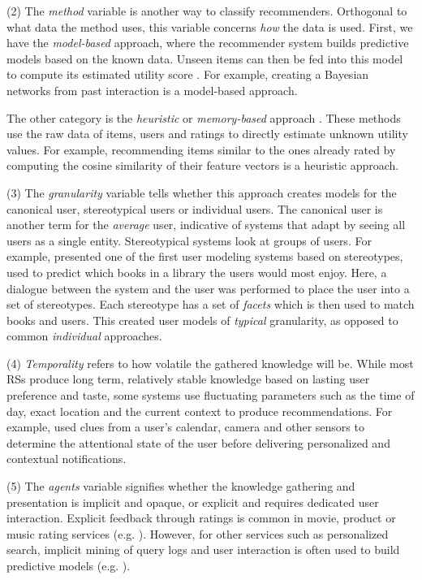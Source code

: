 (2) The \emph{method} variable is another way to classify recommenders. Orthogonal to what data the method uses, this variable
concerns \emph{how} the data is used.
First, we have the \emph{model-based} approach, where the recommender system builds predictive models based on the known data. 
Unseen items can then be fed into this model to compute its estimated utility score
\cite[p.5]{Adomavicius2005}. 
For example, creating a Bayesian networks from past interaction is a model-based approach.

The other category is the \emph{heuristic} or \emph{memory-based} approach \cite[p.5]{Adomavicius2005}. 
These methods use the raw data of items, users and ratings to directly estimate unknown utility values. 
For example, recommending items similar to the ones already rated by computing the cosine similarity of their feature vectors is a heuristic approach.

(3) The \emph{granularity} variable tells whether this approach creates models for the canonical user, stereotypical users or individual users. 
The canonical user is another term for the \emph{average} user, indicative of systems that adapt by seeing all users as a single entity. 
Stereotypical systems look at groups of users. 
For example, \cite{Rich1979} presented one of the first user modeling systems based on stereotypes, 
used to predict which books in a library the users would most enjoy.
Here, a dialogue between the system and the user was performed to place the user into a set of stereotypes. 
Each stereotype has a set of \emph{facets} which is then used to match books and users.
This created user models of \emph{typical} granularity, as opposed to common \emph{individual} approaches.

(4) \emph{Temporality} refers to how volatile the gathered knowledge will be.
While most RSs produce long term, relatively stable knowledge based on lasting user preference and taste, 
some systems use fluctuating parameters such as the time of day, exact location and the current context to produce recommendations.
For example, \cite{Horvitz} used clues from a user's calendar, camera and other sensors to determine the attentional state
of the user before delivering personalized and contextual notifications.

(5) The \emph{agents} variable signifies whether the knowledge gathering and presentation is implicit and opaque, 
or explicit and requires dedicated user interaction. Explicit feedback through ratings is 
common in movie, product or music rating services (e.g. \cite{Bell2007, Basu1998, Hotho}). 
However, for other services such as personalized search,
implicit mining of query logs and user interaction is often used to build predictive models 
(e.g. \cite{Shen2005, Agichtein2006, Speretta2000, Teevan2005}).



